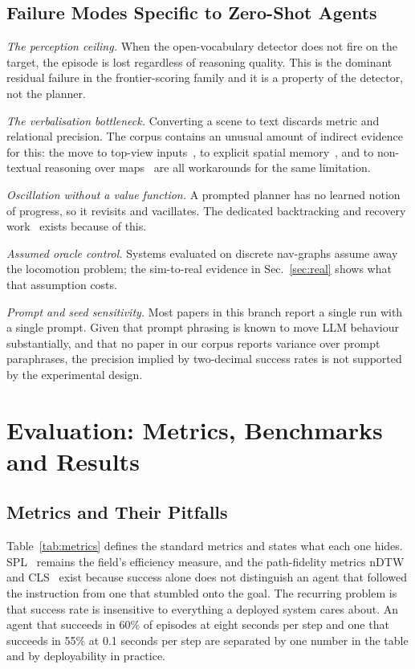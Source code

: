 \documentclass[journal]{IEEEtran}
\begin{document}
\subsection{Failure Modes Specific to Zero-Shot Agents}\label{sec:zsfail}
\emph{The perception ceiling.} When the open-vocabulary detector does not
fire on the target, the episode is lost regardless of reasoning quality.
This is the dominant residual failure in the frontier-scoring family and it
is a property of the detector, not the planner.

\emph{The verbalisation bottleneck.} Converting a scene to text discards
metric and relational precision. The corpus contains an unusual amount of
indirect evidence for this: the move to top-view
inputs~\cite{zhong2026topv,zhang2025mapnav}, to explicit spatial
memory~\cite{zeng2025janusvln}, and to non-textual reasoning over
maps~\cite{xie2026diffusion} are all workarounds for the same limitation.

\emph{Oscillation without a value function.} A prompted planner has no
learned notion of progress, so it revisits and vacillates. The dedicated
backtracking and recovery work~\cite{shi2025smartway,shi2025environment}
exists because of this.

\emph{Assumed oracle control.} Systems evaluated on discrete nav-graphs
assume away the locomotion problem; the sim-to-real evidence in
Sec.~\ref{sec:real} shows what that assumption costs.

\emph{Prompt and seed sensitivity.} Most papers in this branch report a
single run with a single prompt. Given that prompt phrasing is known to move
LLM behaviour substantially, and that no paper in our corpus reports
variance over prompt paraphrases, the precision implied by two-decimal
success rates is not supported by the experimental design.
\section{Evaluation: Metrics, Benchmarks and Results}\label{sec:eval}

\subsection{Metrics and Their Pitfalls}
Table~\ref{tab:metrics} defines the standard metrics and states what each
one hides. SPL~\cite{anderson2018evaluation} remains the field's efficiency
measure, and the path-fidelity metrics
nDTW~\cite{ilharco2019general} and CLS~\cite{jain2019stay} exist because
success alone does not distinguish an agent that followed the instruction
from one that stumbled onto the goal. The recurring problem is that success rate is insensitive to
everything a deployed system cares about. An agent that succeeds in 60\% of
episodes at eight seconds per step and one that succeeds in 55\% at
0.1 seconds per step are separated by one number in the table and by
deployability in practice.
\end{document}
